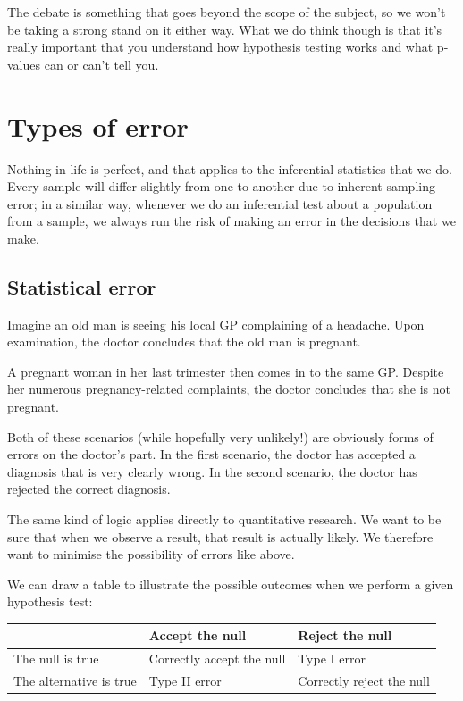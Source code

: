 \documentclass[
]{book}
\begin{document}
The debate is something that goes beyond the scope of the subject, so we won't be taking a strong stand on it either way. What we do think though is that it's really important that you understand how hypothesis testing works and what p-values can or can't tell you.

\section{Types of error}\label{types-of-error}

Nothing in life is perfect, and that applies to the inferential statistics that we do. Every sample will differ slightly from one to another due to inherent sampling error; in a similar way, whenever we do an inferential test about a population from a sample, we always run the risk of making an error in the decisions that we make.

\subsection{Statistical error}\label{statistical-error}

Imagine an old man is seeing his local GP complaining of a headache. Upon examination, the doctor concludes that the old man is pregnant.

A pregnant woman in her last trimester then comes in to the same GP. Despite her numerous pregnancy-related complaints, the doctor concludes that she is not pregnant.

Both of these scenarios (while hopefully very unlikely!) are obviously forms of errors on the doctor's part. In the first scenario, the doctor has accepted a diagnosis that is very clearly wrong. In the second scenario, the doctor has rejected the correct diagnosis.

The same kind of logic applies directly to quantitative research. We want to be sure that when we observe a result, that result is actually likely. We therefore want to minimise the possibility of errors like above.

We can draw a table to illustrate the possible outcomes when we perform a given hypothesis test:

\begin{tabular}{l|l|l}
\hline
 & Accept the null & Reject the null\\
\hline
The null is true & Correctly accept the null & Type I error\\
\hline
The alternative is true & Type II error & Correctly reject the null\\
\hline
\end{tabular}
\end{document}
